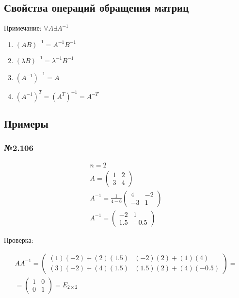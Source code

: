 \documentclass{article}
\begin{document}
\subsection{Свойства операций обращения матриц}

Примечание: $\forall A \exists A^{-1}$

\begin{enumerate}
	\item $(AB)^{-1} = A^{-1} B^{-1}$
	\item $(\lambda B)^{-1} = \lambda^{-1} B^{-1}$
	\item $(A^{-1})^{-1} = A$
	\item $(A^{-1})^T = (A^T)^{-1} = A^{-T}$
\end{enumerate}

\subsection{Примеры}

\subsubsection*{№2.106}

\begin{gather*}
	n = 2 \\
	A = \begin{pmatrix}
		1 & 2 \\
		3 & 4
	\end{pmatrix} \\
	A^{-1} = \frac{1}{4 - 6} \begin{pmatrix}
		4 & -2 \\
		-3 & 1
	\end{pmatrix} \\
	A^{-1} = \begin{pmatrix}
		-2 & 1 \\
		1.5 & -0.5
	\end{pmatrix}
\end{gather*}

Проверка:

\begin{gather*}
	A A^{-1} = \begin{pmatrix}
		(1)(-2) + (2)(1.5) & (-2)(2) + (1)(4) \\
		(3)(-2) + (4)(1.5) & (1.5)(2) + (4)(-0.5)
	\end{pmatrix} = \\
	= \begin{pmatrix}
		1 & 0 \\
		0 & 1
	\end{pmatrix} = E_{2 \times 2}
\end{gather*}
\end{document}
